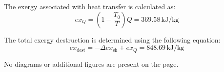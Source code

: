The exergy associated with heat transfer is calculated as:  
\[
ex_Q = \left( 1 - \frac{T_0}{T} \right) Q = 369.58 \, \text{kJ/kg}
\]  

The total exergy destruction is determined using the following equation:  
\[
ex_{\text{dest}} = -\Delta ex_{\text{sh}} + ex_Q = 848.69 \, \text{kJ/kg}
\]  

No diagrams or additional figures are present on the page.